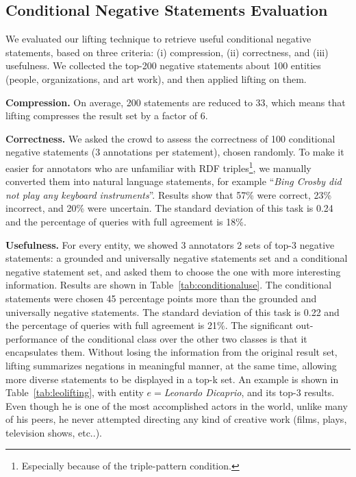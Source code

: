 \subsection{Conditional Negative Statements Evaluation}
\label{subsec:restrictedexp}

We evaluated our lifting technique to retrieve useful conditional negative statements, based on three criteria: (i) compression, (ii) correctness, and (iii) usefulness. We collected the top-200 negative statements about 100 entities (people, organizations, and art work), and then applied lifting on them.

\noindent
\textbf{Compression.}   On average, 200 statements are reduced to 33, which means that lifting compresses the result set by a factor of 6.

\noindent
\textbf{Correctness.} We asked the crowd to assess the correctness of 100 conditional negative statements (3 annotations per statement), chosen randomly. To make it easier for annotators who are unfamiliar with RDF  triples\footnote{Especially because of the triple-pattern condition.}, we manually converted them into natural language statements, for example ``\textit{Bing Crosby did not play any keyboard instruments}''. Results show that 57\% were correct, 23\% incorrect, and 20\% were uncertain. The standard deviation of this task is 0.24 and the percentage of queries with full agreement is 18\%.

\noindent
\textbf{Usefulness.} For every entity, we showed 3 annotators 2 sets of top-3 negative statements: a grounded and universally negative statements set and a conditional negative statement set, and asked them to choose the one with more interesting information. Results are shown in Table~\ref{tab:conditionaluse}. The conditional statements were chosen 45 percentage points more than the grounded and universally negative statements. The standard deviation of this task is 0.22 and the percentage of queries with full agreement is 21\%. The significant out-performance of the conditional class over the other two classes is that it encapsulates them. Without losing the information from the original result set, lifting summarizes negations in meaningful manner, at the same time, allowing more diverse statements to be displayed in a top-k set. An example is shown in Table~\ref{tab:leolifting}, with entity $e=$\textit{Leonardo Dicaprio}, and its top-3 results. Even though he is one of the most accomplished actors in the world, unlike many of his peers, he never attempted directing any kind of creative work (films, plays, television shows, etc..).

